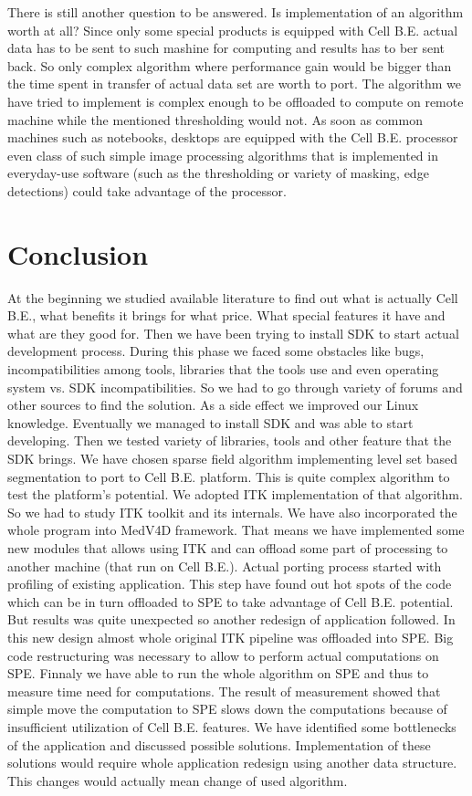 \par
There is still another question to be answered.
Is implementation of an algorithm worth at all?
Since only some special products is equipped with Cell B.E. actual data has to be sent to such mashine for computing and results has to ber sent back.
So only complex algorithm where performance gain would be bigger than the time spent in transfer of actual data set are worth to port.
The algorithm we have tried to implement is complex enough to be offloaded to compute on remote machine while the mentioned thresholding would not.
As soon as common machines such as notebooks, desktops are equipped with the Cell B.E. processor even class of such simple image processing algorithms that is implemented in everyday-use software (such as the thresholding or variety of masking, edge detections) could take advantage of the processor.

\chapter{Conclusion}

At the beginning we studied available literature to find out what is actually Cell B.E., what benefits it brings for what price.
What special features it have and what are they good for.
Then we have been trying to install SDK to start actual development process.
During this phase we faced some obstacles like bugs, incompatibilities among tools, libraries that the tools use and even operating system vs. SDK incompatibilities.
So we had to go through variety of forums and other sources to find the solution.
As a side effect we improved our Linux knowledge.
Eventually we managed to install SDK and was able to start developing.
Then we tested variety of libraries, tools and other feature that the SDK brings.
We have chosen sparse field algorithm implementing level set based segmentation to port to Cell B.E. platform.
This is quite complex algorithm to test the platform's potential.
We adopted ITK implementation of that algorithm.
So we had to study ITK toolkit and its internals.
We have also incorporated the whole program into MedV4D framework.
That means we have implemented some new modules that allows using ITK and can offload some part of processing to another machine (that run on Cell B.E.).
Actual porting process started with profiling of existing application.
This step have found out hot spots of the code which can be in turn offloaded to SPE to take advantage of Cell B.E. potential.
But results was quite unexpected so another redesign of application followed.
In this new design almost whole original ITK pipeline was offloaded into SPE.
Big code restructuring was necessary to allow to perform actual computations on SPE.
Finnaly we have able to run the whole algorithm on SPE and thus to measure time need for computations.
The result of measurement showed that simple move the computation to SPE slows down the computations because of insufficient utilization of Cell B.E. features.
We have identified some bottlenecks of the application and discussed possible solutions.
Implementation of these solutions would require whole application redesign using another data structure.
This changes would actually mean change of used algorithm.

